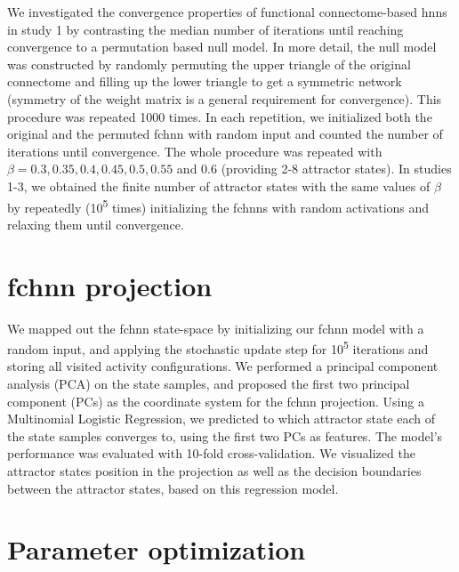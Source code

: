 \documentclass{article}
\begin{document}
We investigated the convergence properties of functional connectome-based \acrshort{hnn}s in study 1 by contrasting the median number of iterations until reaching convergence to a permutation based null model. In more detail, the null model was constructed by randomly permuting the upper triangle of the original connectome and filling up the lower triangle to get a symmetric network (symmetry of the weight matrix is a general requirement for convergence). This procedure was repeated 1000 times. In each repetition, we initialized both the original and the permuted \acrshort{fchnn} with random input and counted the number of iterations until convergence. The whole procedure was repeated with $\beta=0.3, 0.35, 0.4, 0.45, 0.5, 0.55$ and 0.6 (providing 2-8 attractor states).
In studies 1-3, we obtained the finite number of attractor states with the same values of $\beta$ by repeate\acrshort{dl}y (10\textsuperscript{5} times) initializing the \acrshort{fchnn}s with random activations and relaxing them until convergence.

\section{\acrshort{fchnn} projection}

We mapped out the \acrshort{fchnn} state-space by initializing our \acrshort{fchnn} model with a random input, and applying the stochastic update step for 10\textsuperscript{5} iterations and storing all visited activity configurations.
We performed a principal component analysis (PCA) on the state samples, and proposed the first two principal component (PCs) as the coordinate system for the \acrshort{fchnn} projection. Using a Multinomial Logistic Regression, we predicted to which attractor state each of the state samples converges to, using the first two PCs as features. The model's performance was evaluated with 10-fold cross-validation. We visualized the attractor states position in the projection as well as the decision boundaries between the attractor states, based on this regression model.

\section{Parameter optimization}
\end{document}
